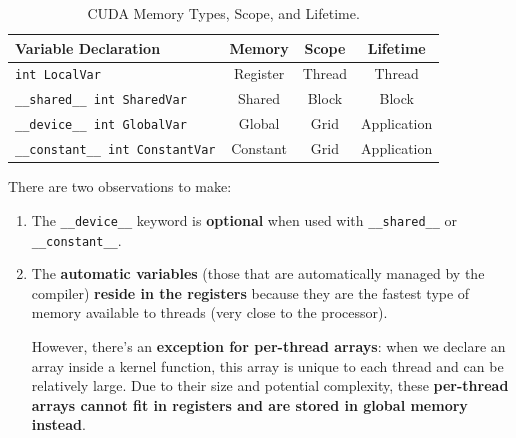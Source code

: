 \begin{table}[!htp]
    \centering
    \begin{tabular}{@{} l c c c @{}}
    \toprule
    \textbf{Variable Declaration} & \textbf{Memory} & \textbf{Scope} & \textbf{Lifetime} \\
    \midrule
    \texttt{int LocalVar} & Register & Thread & Thread \\
    \texttt{\_\_shared\_\_ int SharedVar} & Shared & Block & Block \\
    \texttt{\_\_device\_\_ int GlobalVar} & Global & Grid & Application \\
    \texttt{\_\_constant\_\_ int ConstantVar} & Constant & Grid & Application \\
    \bottomrule
    \end{tabular}
    \caption{CUDA Memory Types, Scope, and Lifetime.}
\end{table}

\noindent
There are two observations to make:
\begin{enumerate}
    \item The \texttt{\_\_device\_\_} keyword is \textbf{optional} when used with \texttt{\_\_shared\_\_} or \texttt{\_\_constant\_\_}.


    \item The \textbf{automatic variables} (those that are automatically managed by the compiler) \textbf{reside in the registers} because they are the fastest type of memory available to threads (very close to the processor).
    
    However, there's an \textbf{exception for per-thread arrays}: when we declare an array inside a kernel function, this array is unique to each thread and can be relatively large. Due to their size and potential complexity, these \textbf{per-thread arrays cannot fit in registers and are stored in global memory instead}.
\end{enumerate}

